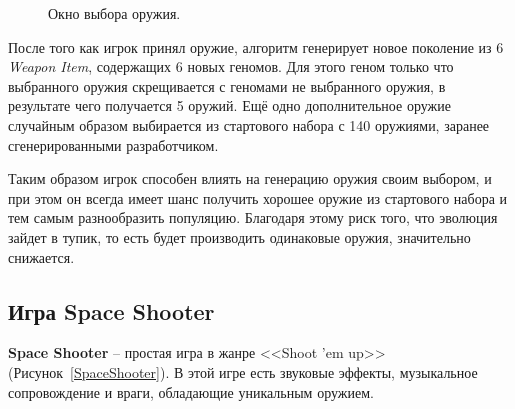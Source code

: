 \begin{figure}[ht]
    \begin{center}

        \caption{
            \label{SSCanvas}
            Окно выбора оружия.
        }
    \end {center}
\end {figure}

После того как игрок принял оружие, алгоритм генерирует новое поколение из 6 \textit{Weapon Item}, содержащих 6 новых геномов. Для этого геном только что выбранного оружия скрещивается с геномами не выбранного оружия, в результате чего получается 5 оружий. Ещё одно дополнительное оружие случайным образом выбирается из стартового набора с 140 оружиями, заранее сгенерированными разработчиком.

Таким образом игрок способен влиять на генерацию оружия своим выбором, и при этом он всегда имеет шанс получить хорошее оружие из стартового набора и тем самым разнообразить популяцию. Благодаря этому риск того, что эволюция зайдет в тупик, то есть будет производить одинаковые оружия, значительно снижается.

\pagebreak

\subsection{Игра Space Shooter}

\textbf{Space Shooter} -- простая игра в жанре <<Shoot ’em up>> (Рисунок~\ref{SpaceShooter}). В этой игре есть звуковые эффекты, музыкальное сопровождение и враги, обладающие уникальным оружием.

